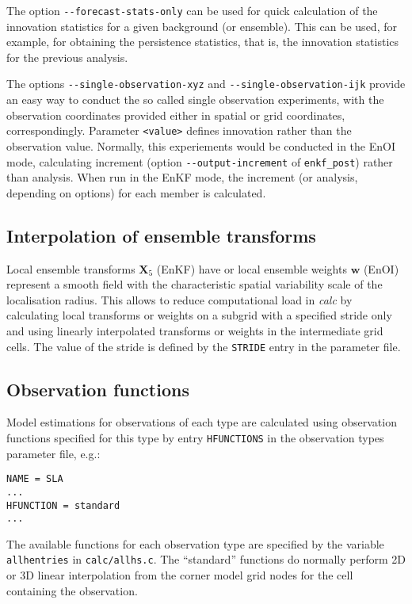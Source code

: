 \documentclass[11pt]{report}
\newcommand{\mb} {\mathbf}
\begin{document}
The option \verb|--forecast-stats-only| can be used for quick calculation of the innovation statistics for a given background (or ensemble).
This can be used, for example, for obtaining the persistence statistics, that is, the innovation statistics for the previous analysis.

The options \verb|--single-observation-xyz| and \verb|--single-observation-ijk| provide an easy way to conduct the so called single observation experiments, with the observation coordinates provided either in spatial or grid coordinates, correspondingly.
Parameter \verb|<value>| defines innovation rather than the observation value.
Normally, this experiements would be conducted in the EnOI mode, calculating increment (option \verb|--output-increment| of \verb|enkf_post|) rather than analysis.
When run in the EnKF mode, the increment (or analysis, depending on options) for each member is calculated.

\subsection{Interpolation of ensemble transforms}

Local ensemble transforms $\mb X_5$ (EnKF) have or local ensemble weights $\mb w$ (EnOI) represent a smooth field with the characteristic spatial variability scale of the localisation radius.
This allows to reduce computational load in \emph{calc} by calculating local transforms or weights on a subgrid with a specified stride only and using linearly interpolated transforms or weights in the intermediate grid cells.
The value of the stride is defined by the \verb|STRIDE| entry in the parameter file.

\subsection{Observation functions}
\label{sec:hfunctions}

Model estimations for observations of each type are calculated using observation functions specified for this type by entry \verb|HFUNCTIONS| in the observation types parameter file, e.g.:
\begin{Verbatim}[frame=single,fontsize=\footnotesize]
NAME = SLA
...
HFUNCTION = standard
...
\end{Verbatim}
The available functions for each observation type are specified by the variable \verb|allhentries| in \verb|calc/allhs.c|.
The ``standard'' functions do normally perform 2D or 3D linear interpolation from the corner model grid nodes for the cell containing the observation.
\end{document}
